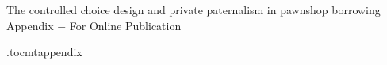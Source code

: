 
% 


%     


% 


\setcounter{table}{0}
\setcounter{figure}{0}
\setcounter{section}{0}


\begin{center}
	\LARGE The controlled choice design and private paternalism in pawnshop borrowing \\[0.5em]
	\Large{Appendix $-$ For Online Publication} \\[1em]
	\large \author{Craig McIntosh \and Isaac Meza \and Joyce Sadka \and Enrique Seira \and Francis J.\ DiTraglia}
\end{center}

\appendix
{}
\renewcommand\thefigure{OA-\arabic{figure}}
\renewcommand\thetable{OA-\arabic{table}}
\renewcommand*{\thepage}{OA - \arabic{page}}
\renewcommand\thesection{Appendix \Alph{section}.}
\renewcommand\thesubsection{\Alph{section}.\arabic{subsection}}

\renewcommand\cftsecdotsep{\cftdotsep}
\renewcommand\cftsubsecdotsep{\cftnodots}
\renewcommand{\cftsecnumwidth}{6em}
 \renewcommand{\cftpnumalign}{r}


\renewcommand{\cftsecleader}{\cftdotfill{\cftsecdotsep}\hspace{1.8em}}

\etocdepthtag.toc{mtappendix}



